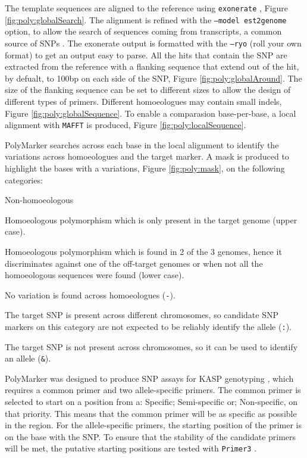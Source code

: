 The template sequences are aligned to the reference using \texttt{exonerate} \citep{Slater2005}, Figure \ref{fig:poly:globalSearch}. 
The alignment is refined with the \texttt{--model est2genome} option, to allow the search of sequences coming from transcripts, a common source of SNPs \citep{Allen2011}. 
The exonerate output is formatted with the \texttt{--ryo} (roll your own format) to get an output easy to parse. 
All the hits that contain the SNP are extracted from the reference with a flanking sequence that extend out of the hit, by defualt, to 100bp on each side of the SNP, Figure \ref{fig:poly:globalAround}.
The size of the flanking sequence can be set to different sizes to allow the design of different types of primers. 
Different homoeologues may contain small indels, Figure \ref{fig:poly:globalSequence}. 
To enable a comparasion base-per-base, a local alignment with \texttt{MAFFT} \citep{Katoh2013} is produced, Figure \ref{fig:poly:localSequence}. 

PolyMarker searches across each base in the local alignment to identify the variations across homoeologues and the target marker.
A mask is produced to highlight the bases with a variations, Figure \ref{fig:poly:mask}, on the following categories:
\begin{labeling}{Non-homoeologous}
\item [Specific] Homoeologous polymorphism which is only present in the target genome (upper case).
\item [Semi-specific] Homoeologous polymorphism which is found in 2 of the 3 genomes, hence it discriminates against one of the off-target genomes or when not all the homoeologous sequences were found (lower case).
\item [Non-specific] No variation is found across homoeologues (\texttt{-}).
\item [Homoeologous] The target SNP is present across different chromosomes, so candidate SNP markers on this category are not expected to be reliably identify the allele (\texttt{:}).
\item [Non-homoeologous] The target SNP is not present across chromosomes, so it can be used to identify an allele (\texttt{\&}).
\end{labeling} 

PolyMarker was designed to produce SNP assays for KASP genotyping \citep{LGC}, which requires a common primer and two allele-specific primers. 
The common primer is selected to start on a position from a: Specific; Semi-specific or; Non-specific, on that priority. 
This means that the common primer will be as specific as possible in the region. 
For the allele-specific primers, the starting position of the primer is on the base with the SNP. 
To ensure that the stability of the candidate primers will be met, the putative starting positions are tested with \texttt{Primer3} \citep{Rozen}. 

